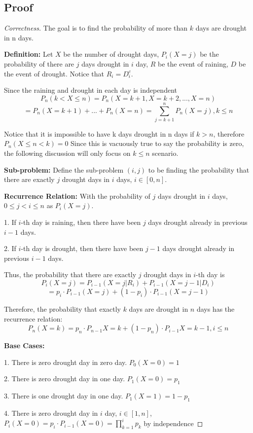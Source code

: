 \documentclass[openany]{article}
\begin{document}
\subsection*{Proof}
\begin{proof}[Correctness]{}
The goal is to find the probability of more than $k$ days are drought in n days.

\textbf{Definition:} Let $X$ be the number of drought days, $P_i(X=j)$ be the probability of there are $j$ days drought in $i$ day, $R$ be the event of raining, $D$ be the event of drought. Notice that $R_i=D_i^c$.

Since the raining and drought in each day is independent \[P_n(k<X\leq n) = P_n(X=k+1, X=k+2, ..., X= n)\] \[= P_n(X=k+1) + ... + P_n(X=n) = \sum_{j=k+1}^{n}P_n(X=j), k \leq n\]

Notice that it is impossible to have k days drought in n days if $k>n$, therefore $P_n(X\leq n < k) = 0$ Since this is vacuously true to say the probability is zero, the following discussion will only focus on $k\leq n$ scenario.

\textbf{Sub-problem:} Define the sub-problem $(i,j)$ to be finding the probability that there are exactly $j$ drought days in $i$ days, $i\in[0,n]$.
    
\textbf{Recurrence Relation:} With the probability of $j$ days drought in $i$ days,  $0\leq j<i\leq n$ as $P_i(X=j)$.

1. If $i$-th day is raining, then there have been $j$ days drought already in previous $i-1$ days.

2. If $i$-th day is drought, then there have been $j-1$ days drought already in previous $i-1$ days.

Thus, the probability that there are exactly $j$ drought days in $i$-th day is \[P_i(X=j) = P_{i-1}(X=j|R_i) + P_{i-1}(X=j-1|D_i)\]
\[=p_i\cdot P_{i-1}(X=j) + (1-p_i)\cdot P_{i-1}(X=j-1)\]

Therefore, the probability that exactly $k$ days are drought in $n$ days has the recurrence relation:
\[P_n(X=k) = p_n\cdot P_{n-1}{X=k} + (1-p_n)\cdot P_{i-1}{X=k-1}, i\leq n\]
    
    
\textbf{Base Cases:}

1. There is zero drought day in zero day. $P_0(X=0)=1$

2. There is zero drought day in one day. $P_1(X=0)=p_1$

3. There is one drought day in one day. $P_1(X=1)=1-p_1$

4. There is zero drought day in $i$ day, $i\in[1,n]$, $P_i(X=0)=p_i\cdot P_{i-1}(X=0) = \prod_{k=1}^{i}p_k$ by independence


\end{proof}
\end{document}
